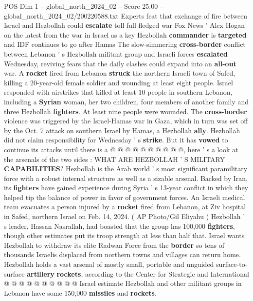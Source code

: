 \begin{textsample}{POS Dim 1 – global\_north\_2024\_02 – Score 25.00 – global\_north\_2024\_02/200220588.txt}  \label{ex:f1_pos_276}
Experts feat that exchange of fire between Israel and Hezbollah could \textbf{escalate} toll full fledged war Fox News ' Alex Hogan on the latest from the war in Israel as a key Hezbollah \textbf{commander} is \textbf{targeted} and IDF continues to go after Hamas The slow-simmering \textbf{cross-border} conflict between Lebanon ' s Hezbollah militant group and Israeli forces \textbf{escalated} Wednesday, reviving fears that the daily clashes could expand into an \textbf{all-out} war.
A \textbf{rocket} fired from Lebanon \textbf{struck} the northern Israeli town of Safed, killing a 20-year-old female soldier and wounding at least eight people.
Israel responded with airstrikes that killed at least 10 people in southern Lebanon, including a \textbf{Syrian} woman, her two children, four members of another family and three Hezbollah \textbf{fighters}.
At least nine people were wounded.
The \textbf{cross-border} violence was triggered by the Israel-Hamas war in Gaza, which in turn was set off by the Oct. 7 attack on southern Israel by Hamas, a Hezbollah \textbf{ally}.
Hezbollah did not claim responsibility for Wednesday ' s \textbf{strike}.
But it has \textbf{vowed} to continue its attacks until there is a @ @ @ @ @ @ @ @ @ @, here ' s a look at the arsenals of the two sides : WHAT ARE HEZBOLLAH ' S MILITARY \textbf{CAPABILITIES}?
Hezbollah is the Arab world ' s most significant paramilitary force with a robust internal structure as well as a sizable arsenal.
Backed by Iran, its \textbf{fighters} have gained experience during Syria ' s 13-year conflict in which they helped tip the balance of power in favor of government forces.
An Israeli medical team evacuates a person injured by a \textbf{rocket} fired from Lebanon, at Ziv hospital in Safed, northern Israel on Feb. 14, 2024. ( AP Photo/Gil Eliyahu ) Hezbollah ' s leader, Hassan Nasrallah, had boasted that the group has 100,000 \textbf{fighters}, though other estimates put its troop strength at less than half that.
Israel wants Hezbollah to withdraw its elite Radwan Force from the \textbf{border} so tens of thousands Israelis displaced from northern towns and villages can return home.
Hezbollah holds a vast arsenal of mostly small, portable and unguided surface-to-surface \textbf{artillery} \textbf{rockets}, according to the Center for Strategic and International @ @ @ @ @ @ @ @ @ @ Israel estimate Hezbollah and other militant groups in Lebanon have some 150,000 \textbf{missiles} and \textbf{rockets}.

\end{textsample}
